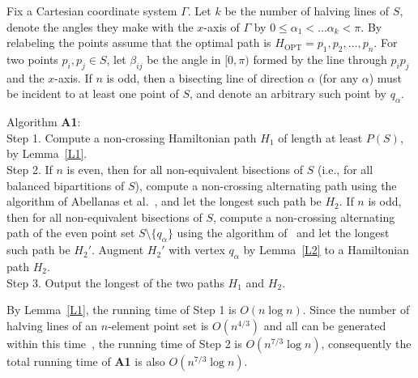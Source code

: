 \documentclass[proceedings]{stacs}
\begin{document}
Fix a Cartesian coordinate system $\Gamma$.
Let $k$ be the number of halving lines of $S$, denote the angles they
make with the $x$-axis of $\Gamma$ by $0 \leq \alpha_1 < \ldots \alpha_k < \pi$.
By relabeling the points assume that the optimal path is
$H_\textrm{OPT} = p_1,p_2,\ldots,p_n$.
For two points $p_i, p_j \in S$, let $\beta_{ij}$ be the angle in $[0,\pi)$
formed by the line through $p_i p_j$ and the $x$-axis.
If $n$ is odd, then a bisecting line of direction $\alpha$ (for any $\alpha$)
must be incident to at least one point of $S$, and denote an arbitrary such
point by $q_\alpha$.

\smallskip
\noindent Algorithm {\bf A1}:\\
{\sc Step 1}. Compute a non-crossing
Hamiltonian path $H_1$ of length at least $P(S)$, by Lemma~\ref{L1}.\\
{\sc Step 2}. If $n$ is even, then for all non-equivalent bisections of
$S$ (i.e., for all balanced bipartitions of $S$), compute a non-crossing
alternating path using the algorithm of Abellanas et al.~\cite{AGH+99}, and
let the longest such path be $H_2$. If $n$ is odd, then for all non-equivalent
bisections of $S$, compute a non-crossing
alternating path of the even point set $S\setminus \{q_\alpha\}$ using the
algorithm of~\cite{AGH+99} and let the longest such path be $H_2'$.
Augment $H_2'$ with vertex $q_\alpha$ by Lemma~\ref{L2} to a Hamiltonian path
$H_2$.\\
{\sc Step 3}. Output the longest of the two paths $H_1$ and $H_2$.

\smallskip
By Lemma~\ref{L1}, the running time of {\sc Step 1} is
$O(n \log{n})$. Since the number of halving lines of an $n$-element
point set is $O(n^{4/3})$ and all can be generated within this time~\cite{De98},
the running time of {\sc Step 2} is $O(n^{7/3}\log{n})$, consequently
the total running time of {\bf A1} is also $O(n^{7/3}\log{n})$.
\end{document}
